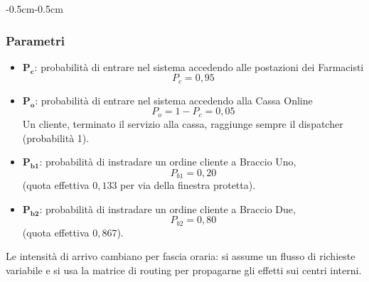 \documentclass{article}
\begin{document}
\begin{adjustwidth}{-0.5cm}{-0.5cm}
\begin{minipage}[t]{0.48\textwidth}
\subsubsection*{Parametri}
\begin{itemize}
    \setlength{\itemsep}{15pt} 
    
    \setlength{\abovedisplayskip}{3pt}
    \setlength{\belowdisplayskip}{3pt}
    \setlength{\abovedisplayshortskip}{3pt}
    \setlength{\belowdisplayshortskip}{3pt}

    \item $\mathbf{P_c}$: probabilità di entrare nel sistema accedendo alle postazioni dei Farmacisti
    \[ P_c = 0{,}95\]

   \item $\mathbf{P_o}$: probabilità di entrare nel sistema accedendo alla Cassa Online
    \[P_o = 1-P_c = 0{,}05\] 
    Un cliente, terminato il servizio alla cassa, raggiunge sempre il dispatcher (probabilità 1).

    \item $\mathbf{P_{b1}}$: probabilità di instradare un ordine cliente a Braccio Uno,
     \[P_{b1}=0{,}20\] 
     (quota effettiva $0{,}133$ per via della finestra protetta).

    \item $\mathbf{P_{b2}}$: probabilità di instradare un ordine cliente a Braccio Due, 
    \[P_{b2}=0{,}80\]
      (quota effettiva $0{,}867$).
\end{itemize}
\end{minipage}\hfill
\begin{minipage}[t]{0.48\textwidth}
\raggedright
Le intensità di arrivo cambiano per fascia oraria: si assume un flusso di richieste variabile e si
usa la matrice di routing per propagarne gli effetti sui centri interni.


\end{minipage}
\end{adjustwidth}
\end{document}

